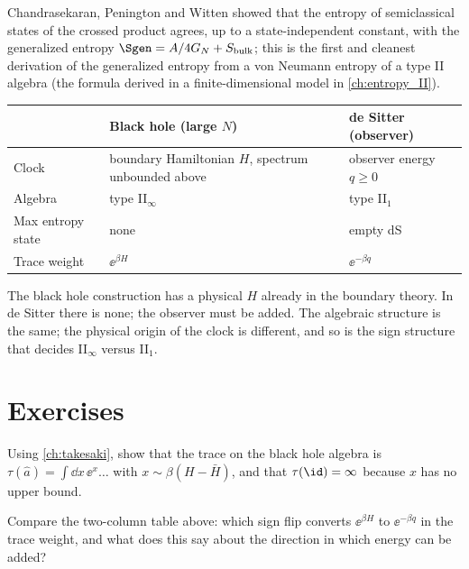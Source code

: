 Chandrasekaran, Penington and Witten \cite{CPW2022} showed that the entropy of semiclassical states of the crossed product agrees, up to a state-independent constant, with the generalized entropy $\Sgen=A/4G_N+S_{\rm bulk}$; this is the first and cleanest derivation of the generalized entropy from a von Neumann entropy of a type II algebra (the formula derived in a finite-dimensional model in \cref{ch:entropy_II}).

\begin{center}
\renewcommand{\arraystretch}{1.3}
\begin{tabular}{@{}lll@{}}
\toprule
 & Black hole (large $N$) & de Sitter (observer)\\
\midrule
Clock & boundary Hamiltonian $H$, spectrum unbounded above & observer energy $q\ge0$\\
Algebra & type II$_\infty$ & type II$_1$\\
Max entropy state & none & empty dS\\
Trace weight & $\ee^{\beta H}$ & $\ee^{-\beta q}$\\
\bottomrule
\end{tabular}
\end{center}

\begin{whatwrong}
The black hole construction has a physical $H$ already in the boundary theory. In de Sitter there is none; the observer must be added. The algebraic structure is the same; the physical origin of the clock is different, and so is the sign structure that decides II$_\infty$ versus II$_1$.
\end{whatwrong}

\section*{Exercises}
\begin{exercise}
Using \cref{ch:takesaki}, show that the trace on the black hole algebra is $\tau(\hat a)=\int\dd x\,\ee^{x}\ldots$ with $x\sim\beta(H-\bar H)$, and that $\tau(\id)=\infty$ because $x$ has no upper bound.
\end{exercise}
\begin{exercise}
Compare the two-column table above: which sign flip converts $\ee^{\beta H}$ to $\ee^{-\beta q}$ in the trace weight, and what does this say about the direction in which energy can be added?
\end{exercise}
